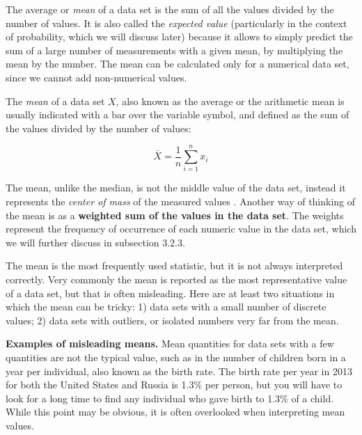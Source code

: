\documentclass[
  letterpaper,
  DIV=11,
  numbers=noendperiod]{scrreprt}
\begin{document}
The average or  \emph{mean} of a data
set is the sum of all the values divided by the number of values. It is
also called the \emph{expected value} (particularly in the context of
probability, which we will discuss later) because it allows to simply
predict the sum of a large number of measurements with a given mean, by
multiplying the mean by the number. The mean can be calculated only for
a numerical data set, since we cannot add non-numerical values.

\begin{tcolorbox}[enhanced jigsaw, coltitle=black, arc=.35mm, opacitybacktitle=0.6, breakable, bottomtitle=1mm, toptitle=1mm, titlerule=0mm, colback=white, leftrule=.75mm, rightrule=.15mm, colframe=quarto-callout-note-color-frame, colbacktitle=quarto-callout-note-color!10!white, opacityback=0, title=\textcolor{quarto-callout-note-color}{\faInfo}\hspace{0.5em}{Definition}, left=2mm, toprule=.15mm, bottomrule=.15mm]

The \emph{mean} of a data set \(X\), also known as the average or the
arithmetic mean is usually indicated with a bar over the variable
symbol, and defined as the sum of the values divided by the number of
values:

\end{tcolorbox}

\begin{equation}
  \bar X  = \frac{1}{n} \sum_{i=1}^n x_i 
\label{eq:ch3_mean_def}
\end{equation}

The mean, unlike the median, is not the middle value of the data set,
instead it represents the \emph{center of mass} of the measured values
\cite{whitlock_analysis_2008}. Another way of thinking of the mean is as
a \textbf{weighted sum of the values in the data set}. The weights
represent the frequency of occurrence of each numeric value in the data
set, which we will further discuss in subsection 3.2.3.

The mean is the most frequently used statistic, but it is not always
interpreted correctly. Very commonly the mean is reported as the most
representative value of a data set, but that is often misleading. Here
are at least two situations in which the mean can be tricky: 1) data
sets with a small number of discrete values; 2) data sets with outliers,
or isolated numbers very far from the mean.

\textbf{Examples of misleading means.} Mean quantities for data sets
with a few quantities are not the typical value, such as in the number
of children born in a year per individual, also known as the birth rate.
The birth rate per year in 2013 for both the United States and Russia is
1.3\% per person, but you will have to look for a long time to find any
individual who gave birth to 1.3\% of a child. While this point may be
obvious, it is often overlooked when interpreting mean values.
\end{document}
